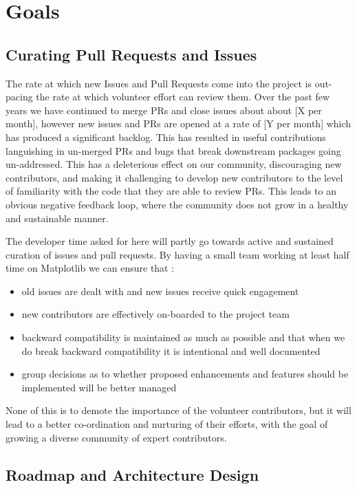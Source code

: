 \documentclass[11pt]{article}  %
\begin{document}
\section{Goals}
\subsection{Curating Pull Requests and Issues}

The rate at which new Issues and Pull Requests come into the project
is out-pacing the rate at which volunteer effort can review them.
Over the past few years we have continued to merge PRs and close
issues about about [X per month], however new issues and PRs are opened
at a rate of [Y per month] which has produced a significant backlog.
This has resulted in useful contributions languishing in un-merged PRs
and bugs that break downstream packages going un-addressed.  This has
a deleterious effect on our community, discouraging new contributors,
and making it challenging to develop new contributors to the level of
familiarity with the code that they are able to review PRs. This leads
to an obvious negative feedback loop, where the community does not
grow in a healthy and sustainable manner.

The developer time asked for here will partly go towards active and
sustained curation of issues and pull requests.  By having a small
team working at least half time on Matplotlib we can ensure that :

\begin{itemize}
\item old issues are dealt with and new issues receive quick engagement
\item new contributors are effectively on-boarded to the project team
\item backward compatibility is maintained as much as possible and
  that when we do break backward compatibility it is intentional and
  well documented
\item group decisions as to whether proposed enhancements and features
  should be implemented will be better managed
\end{itemize}

None of this is to demote the importance of the volunteer
contributors, but it will lead to a better co-ordination and nurturing
of their efforts, with the goal of growing a diverse community of
expert contributors.

\subsection{Roadmap and Architecture Design}
\end{document}
